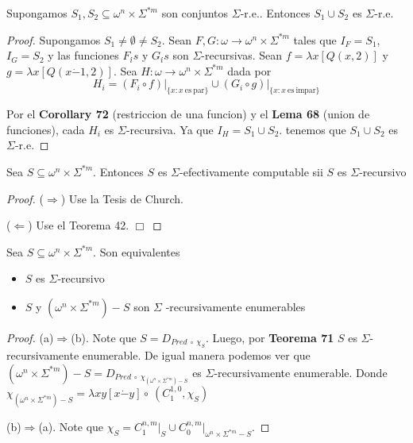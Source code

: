  \begin{corollary}
    Supongamos $S_{1},S_{2}\subseteq \omega ^{n}\times \Sigma ^{\ast m}$ son conjuntos $\Sigma $-r.e..
    Entonces $S_{1}\cup S_{2}$ es $\Sigma $-r.e.
  \begin{proof}
    Supongamos $S_{1}\neq \emptyset \neq S_{2}.$ Sean $F,G:\omega \rightarrow \omega ^{n}\times \Sigma ^{\ast m}$
    tales que $I_{F}=S_{1}$, $I_{G}=S_{2}$ y las funciones $F_{i} {\acute{}} s$ y $G_{i} {\acute{}} s$ son
    $\Sigma $-recursivas. Sean $f=\lambda x\left[ Q(x,2)\right] $ y $ g=\lambda x\left[ Q(x\dot{-}1,2)\right] .$
    Sea $H:\omega \rightarrow \omega ^{n}\times \Sigma ^{\ast m}$ dada por
    \[
      \displaystyle H_{i}=(F_{i}\circ f)\mathrm{\mid }_{\{x:x\mathrm{\ es\ par}\}}\cup (G_{i}\circ g)
      \mathrm{\mid }_{\{x:x\mathrm{\ es\ impar}\}}
    \]

    Por el \textbf{Corollary 72} (restriccion de una funcion) y el \textbf{Lema 68} (union de funciones),
    cada $H_{i}$ es $ \Sigma $-recursiva. Ya que $I_{H}=S_{1}\cup S_{2}$.
    tenemos que $S_{1}\cup S_{2}$ es $\Sigma $-r.e.
  \end{proof}
  \end{corollary}

  \begin{theorem}
     Sea $S\subseteq \omega ^{n}\times \Sigma ^{\ast m}$. Entonces $S$ es $\Sigma $-efectivamente computable sii
     $S$ es $\Sigma $-recursivo
  \begin{proof}
    ($\Rightarrow $) Use la Tesis de Church.

    ($\Leftarrow $) Use el Teorema 42. $\Box$
  \end{proof}
  \end{theorem}

  \begin{theorem} Sea $S\subseteq \omega ^{n}\times \Sigma ^{\ast m}.$ Son equivalentes
    \begin{itemize}
      \item[(a)] $S$ es $\Sigma $-recursivo
      \item[(b)] $S$ y $(\omega ^{n}\times \Sigma ^{\ast m})-S$ son $\Sigma $ -recursivamente enumerables
    \end{itemize}
  \begin{proof}
    (a)$\Rightarrow $(b)$.$ Note que $S=D_{Pred\ \circ\ \chi _{S}}.$
    Luego, por \textbf{Teorema 71} $S$ es $\Sigma $-recursivamente enumerable. De igual manera podemos ver que
    $(\omega ^{n}\times \Sigma ^{\ast m})-S=D_{Pred\ \circ\ \chi _{(\omega ^{n}\times \Sigma ^{\ast m})-S}}$
    es $\Sigma $-recursivamente enumerable.
    Donde $\chi_{(\omega ^{n}\times \Sigma ^{\ast m})-S} = \lambda xy \left[x \dot{-}y\right] \circ\ (C_{1}^{1,0},
    \chi_S)$

    (b)$\Rightarrow $(a). Note que $\chi _{S}=C_{1}^{n,m}\mathrm{\mid }_{S}\cup C_{0}^{n,m}\mathrm{\mid }_{\omega
    ^{n}\times \Sigma ^{\ast m}-S}$.
  \end{proof}
  \end{theorem}

